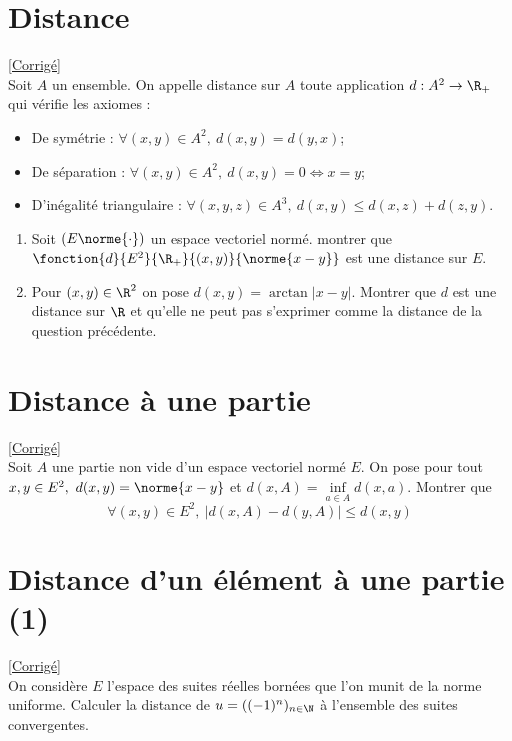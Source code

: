 \documentclass{book}
\begin{document}
	\section{Distance }
	\textcolor{blue}{\hyperref[Distance corrigé]{[Corrigé]}}\\
	\label{Distance}
	Soit $A$ un ensemble.
	On appelle distance sur $A$ toute application $d:A^2\to \R_+$ qui vérifie les axiomes :
	\begin{itemize}
		\item De symétrie : $\forall (x,y)\in A^2,\ d(x,y)=d(y,x)$;
		\item De séparation : $\forall (x,y)\in A^2,\ d(x,y)=0\iff x=y$;
		\item D'inégalité triangulaire : $\forall (x,y,z)\in A^3,\ d(x,y)\leq d(x,z)+d(z,y)$.
	\end{itemize}
	\begin{enumerate}[leftmargin=*]
		\item Soit $(E\norme{\cdot})$ un espace vectoriel normé. montrer que $\fonction{d}{E^2}{\R_+}{(x,y)}{\norme{x-y}}$ est une distance sur $E$.
		\item Pour $(x,y)\in \R^2$ on pose $d(x,y)=\arctan|x-y|$. Montrer que $d$ est une distance sur $\R$ et qu'elle ne peut pas s'exprimer comme la distance de la question précédente.
	\end{enumerate}
	
	\section{Distance à une partie}
	\textcolor{blue}{\hyperref[sec:distance-a-une-partie]{[Corrigé]}}\\
	\label{Distance à une partie}
	Soit $A$ une partie non vide d'un espace vectoriel normé $E$. On pose pour tout $x,y\in E^2,\ d(x,y)=\norme{x-y}$ et $d(x,A)=\inf\limits_{a\in A}d(x,a)$. Montrer que
	$$\forall (x,y)\in E^2,\ |d(x,A)-d(y,A)|\leq d(x,y)$$
	
	\section{Distance d'un élément à une partie (1)}
	\textcolor{blue}{\hyperref[sec:distance-dun-element-a-une-partie-1]{[Corrigé]}}\\
	\label{Distance d'un élément à une partie 1}
	On considère $E$ l'espace des suites réelles bornées que l'on munit de la norme uniforme. Calculer la distance de $u=((-1)^n)_{n\in \N}$ à l'ensemble des suites convergentes.
	
\end{document}
